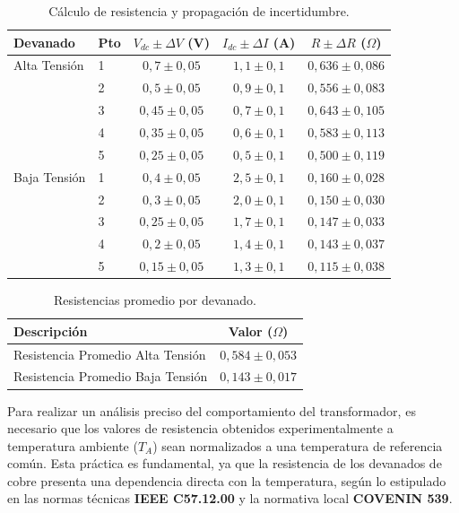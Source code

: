 \begin{table}[H]
\centering
\caption{Cálculo de resistencia y propagación de incertidumbre.}
\renewcommand{\arraystretch}{1.3}
\begin{tabular}{llccc}
\toprule
\textbf{Devanado} & \textbf{Pto} & \textbf{$V_{dc} \pm \Delta V$ (V)} & \textbf{$I_{dc} \pm \Delta I$ (A)} & \textbf{$R \pm \Delta R$ ($\Omega$)} \\ 
\midrule
Alta Tensión & 1 & $0,7 \pm 0,05$ & $1,1 \pm 0,1$ & $0,636 \pm 0,086$ \\
& 2 & $0,5 \pm 0,05$ & $0,9 \pm 0,1$ & $0,556 \pm 0,083$ \\
& 3 & $0,45 \pm 0,05$ & $0,7 \pm 0,1$ & $0,643 \pm 0,105$ \\
& 4 & $0,35 \pm 0,05$ & $0,6 \pm 0,1$ & $0,583 \pm 0,113$ \\
& 5 & $0,25 \pm 0,05$ & $0,5 \pm 0,1$ & $0,500 \pm 0,119$ \\
\midrule
Baja Tensión & 1 & $0,4 \pm 0,05$ & $2,5 \pm 0,1$ & $0,160 \pm 0,028$ \\
& 2 & $0,3 \pm 0,05$ & $2,0 \pm 0,1$ & $0,150 \pm 0,030$ \\
& 3 & $0,25 \pm 0,05$ & $1,7 \pm 0,1$ & $0,147 \pm 0,033$ \\
& 4 & $0,2 \pm 0,05$ & $1,4 \pm 0,1$ & $0,143 \pm 0,037$ \\
& 5 & $0,15 \pm 0,05$ & $1,3 \pm 0,1$ & $0,115 \pm 0,038$ \\
\bottomrule
\end{tabular}
\end{table}

\begin{table}[H]
\centering
\caption{Resistencias promedio por devanado.}
\renewcommand{\arraystretch}{1.3} %
\begin{tabular}{lc}
\toprule
\textbf{Descripción} & \textbf{Valor ($\Omega$)} \\ 
\midrule
Resistencia Promedio Alta Tensión & $0,584 \pm 0,053$ \\
Resistencia Promedio Baja Tensión & $0,143 \pm 0,017$ \\
\bottomrule
\end{tabular}
\end{table}


Para realizar un análisis preciso del comportamiento del transformador, es necesario que los valores de resistencia obtenidos experimentalmente a temperatura ambiente ($T_A$) sean normalizados a una temperatura de referencia común. Esta práctica es fundamental, ya que la resistencia de los devanados de cobre presenta una dependencia directa con la temperatura, según lo estipulado en las normas técnicas \textbf{IEEE C57.12.00} y la normativa local \textbf{COVENIN 539}.

